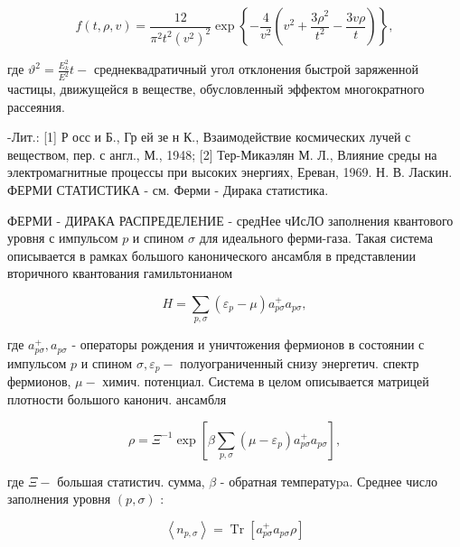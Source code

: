 \documentclass[10pt]{article}
\begin{document}
\[

f(t, \rho, v)=\frac{12}{\pi^{2} t^{2}\left(v^{2}\right)^{2}} \exp \left\{-\frac{4}{v^{2}}\left(v^{2}+\frac{3 \rho^{2}}{t^{2}}-\frac{3 v \rho}{t}\right)\right\},

\]



где $\vartheta^{2}=\frac{E_{k}^{2}}{E^{2}} t-$ среднеквадратичный угол отклонения быстрой заряженной частицы, движущейся в веществе, обусловленный эффектом многократного рассеяния.



-Лит.: [1] Р осс и Б., Гр ей зе н К., Взаимодействие космических лучей с веществом, пер. с англ., М., 1948; [2] Тер-Микаэлян М. Л., Влияние среды на электромагнитные процессы при высоких энергиях, Ереван, 1969. Н. В. Ласкин. ФЕРМИ СТАТИСТИКА - см. Ферми - Дирака статистика.



ФЕРМИ - ДИРАКА РАСПРЕДЕЛЕНИЕ - средНее чИсЛО заполнения квантового уровня с импульсом $p$ и спином $\sigma$ для идеального ферми-газа. Такая система описывается в рамках большого канонического ансамбля в представлении вторичного квантования гамильтонианом



\[

H=\sum_{p, \sigma}\left(\varepsilon_{p}-\mu\right) a_{p \sigma}^{+} a_{p \sigma},

\]



где $a_{p \sigma}^{+}, a_{p \sigma}$ - операторы рождения и уничтожения фермионов в состоянии с импульсом $p$ и спином $\sigma, \varepsilon_{p}-$ полуограниченный снизу энергетич. спектр фермионов, $\mu-$ химич. потенциал. Система в целом описывается матрицей плотности большого канонич. ансамбля



\[

\rho=\Xi^{-1} \exp \left[\beta \sum_{p, \sigma}\left(\mu-\varepsilon_{p}\right) a_{p \sigma}^{+} a_{p \sigma}\right],

\]



где $\Xi-$ большая статистич. сумма, $\beta$ - обратная температуpa. Среднее число заполнения уровня $(p, \sigma)$ :



\[

\left\langle n_{p, \sigma}\right\rangle=\operatorname{Tr}\left[a_{p \sigma}^{+} a_{p \sigma} \rho\right]

\]
\end{document}
